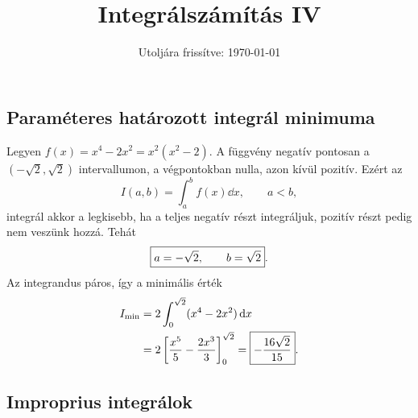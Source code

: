 \documentclass{szb-solution}
\title{Integrálszámítás IV}
\date{Utoljára frissítve: \today}
\begin{document}
\maketitle

\subsection{Paraméteres határozott integrál minimuma}

Legyen $f(x)=x^4-2x^2=x^2(x^2-2)$. A függvény negatív pontosan a
$(-\sqrt2,\sqrt2)$ intervallumon, a végpontokban nulla, azon kívül pozitív.
Ezért az
$$
  I(a,b)=\int_a^b f(x)\dd x,
  \qquad a<b,
$$
integrál akkor a legkisebb, ha a teljes negatív részt integráljuk, pozitív
részt pedig nem veszünk hozzá. Tehát
$$
  \boxed{a=-\sqrt2,\qquad b=\sqrt2}
  \text.
$$
Az integrandus páros, így a minimális érték
\begin{align*}
  I_{\min}
  &=2\int_0^{\sqrt2}(x^4-2x^2)\mathop{}\!\mathrm{d} x\\
  &=2\left[\frac{x^5}{5}-\frac{2x^3}{3}\right]_0^{\sqrt2}
  =\boxed{-\frac{16\sqrt2}{15}}
  \text.
\end{align*}

\subsection{Improprius integrálok}
\end{document}
